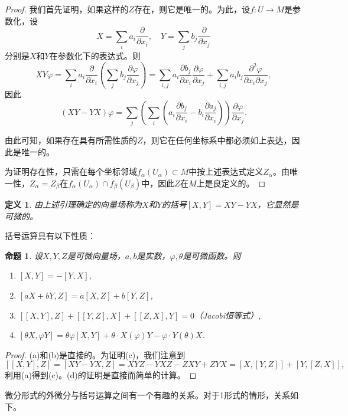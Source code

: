 \documentclass[12pt,a4paper]{ctexbook}
\newtheorem{proposition}[theorem]{命题}
\newtheorem{definition}[theorem]{定义}
\begin{document}
\begin{proof}
我们首先证明，如果这样的$Z$存在，则它是唯一的。为此，设$f:U\to M$是参数化，设
$$X = \sum_i a_i \frac{\partial}{\partial x_i},\quad Y = \sum_j b_j \frac{\partial}{\partial x_j}$$
分别是$X$和$Y$在参数化下的表达式。则
$$XY\varphi = \sum_i a_i \frac{\partial}{\partial x_i}\left(\sum_j b_j \frac{\partial\varphi}{\partial x_j}\right) = \sum_{i,j} a_i \frac{\partial b_j}{\partial x_i}\frac{\partial\varphi}{\partial x_j} + \sum_{i,j} a_i b_j \frac{\partial^2\varphi}{\partial x_i\partial x_j},$$
因此
$$(XY-YX)\varphi = \sum_j \left(\sum_i \left(a_i \frac{\partial b_j}{\partial x_i} - b_i \frac{\partial a_j}{\partial x_i}\right)\right)\frac{\partial\varphi}{\partial x_j}.$$

由此可知，如果存在具有所需性质的$Z$，则它在任何坐标系中都必须如上表达，因此是唯一的。

为证明存在性，只需在每个坐标邻域$f_\alpha(U_\alpha)\subset M$中按上述表达式定义$Z_\alpha$。由唯一性，$Z_\alpha = Z_\beta$在$f_\alpha(U_\alpha)\cap f_\beta(U_\beta)$中，因此$Z$在$M$上是良定义的。
\end{proof}

\begin{definition}
由上述引理确定的向量场称为$X$和$Y$的括号$[X,Y]=XY-YX$，它显然是可微的。
\end{definition}

括号运算具有以下性质：

\begin{proposition}
设$X,Y,Z$是可微向量场，$a,b$是实数，$\varphi,\theta$是可微函数。则
\begin{enumerate}[label=\alph*)]
    \item $[X,Y] = -[Y,X]$,
    \item $[aX+bY, Z] = a[X,Z] + b[Y,Z]$,
    \item $[[X,Y],Z] + [[Y,Z],X] + [[Z,X],Y] = 0$（Jacobi恒等式）,
    \item $[\theta X, \varphi Y] = \theta\varphi[X,Y] + \theta\cdot X(\varphi)Y - \varphi\cdot Y(\theta)X$.
\end{enumerate}
\end{proposition}

\begin{proof}
(a)和(b)是直接的。为证明(c)，我们注意到
$$[[X,Y],Z] = [XY-YX,Z] = XYZ - YXZ - ZXY + ZYX = [X,[Y,Z]] + [Y,[Z,X]],$$
利用(a)得到(c)。(d)的证明是直接而简单的计算。
\end{proof}

微分形式的外微分与括号运算之间有一个有趣的关系。对于1形式的情形，关系如下。
\end{document}
